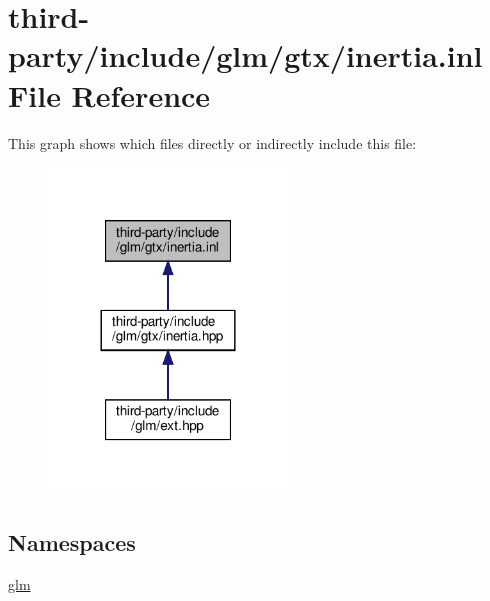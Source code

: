 \hypertarget{inertia_8inl}{}\section{third-\/party/include/glm/gtx/inertia.inl File Reference}
\label{inertia_8inl}
This graph shows which files directly or indirectly include this file\+:
\nopagebreak
\begin{figure}[H]
\begin{center}
\leavevmode
\includegraphics[width=180pt]{inertia_8inl__dep__incl}
\end{center}
\end{figure}
\subsection*{Namespaces}
\begin{DoxyCompactItemize}
\item 
 \hyperlink{namespaceglm}{glm}
\end{DoxyCompactItemize}
